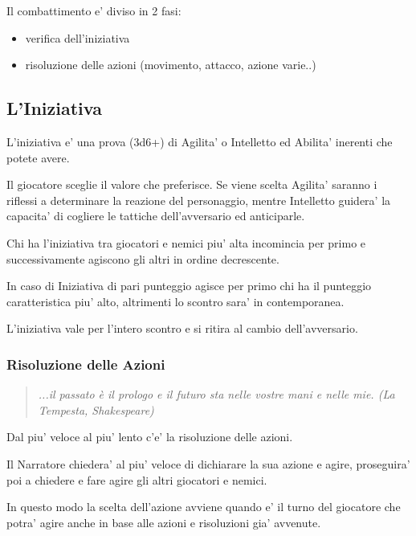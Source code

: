 \documentclass[a4paper,11pt,twoside,openany]{book}
\begin{document}
	\bigskip
	
	Il combattimento e' diviso in 2 fasi:
	\begin{itemize}
		\item verifica dell'iniziativa 
		\item risoluzione delle azioni (movimento, attacco, azione varie..) 
	\end{itemize}
	
	\subsection{L'Iniziativa}
	
	\label{liniziativa}
	
	L'iniziativa e' una prova (3d6+) di Agilita' o Intelletto ed Abilita' inerenti che potete avere.
	
	Il giocatore sceglie il valore che preferisce. Se viene scelta Agilita' saranno i riflessi a determinare la reazione del personaggio, mentre Intelletto guidera' la capacita' di cogliere le tattiche dell'avversario ed anticiparle.
	
	Chi ha l'iniziativa tra giocatori e nemici piu' alta incomincia per primo e successivamente agiscono gli altri in ordine decrescente. 
	
	In caso di Iniziativa di pari punteggio agisce per primo chi ha il punteggio caratteristica piu' alto, altrimenti lo scontro sara' in contemporanea.
	
	L'iniziativa vale per l'intero scontro e si ritira al cambio dell'avversario.
	
	\subsubsection{Risoluzione delle Azioni}
	
	\begin{quote}\textit{
			...il passato è il prologo e il futuro sta nelle vostre mani e nelle mie. (La Tempesta, Shakespeare)
	}\end{quote}
	
	
	\label{risoluzione-delle-azioni}
	
	Dal piu' veloce al piu' lento c'e' la risoluzione delle azioni.
	
	Il Narratore chiedera' al piu' veloce di dichiarare la sua azione e agire, proseguira' poi a chiedere e fare agire gli altri giocatori e nemici.
	
	In questo modo la scelta dell'azione avviene quando e' il turno del giocatore che potra' agire anche in base alle azioni e risoluzioni gia' avvenute.
	
\end{document}
